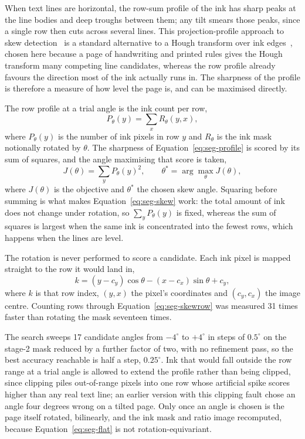 When text lines are horizontal, the row-sum profile of the ink has sharp peaks at the line bodies and deep troughs between them; any tilt smears those peaks, since a single row then cuts across several lines. This projection-profile approach to skew detection~\cite{postl1986} is a standard alternative to a Hough transform over ink edges~\cite{duda1972}, chosen here because a page of handwriting and printed rules gives the Hough transform many competing line candidates, whereas the row profile already favours the direction most of the ink actually runs in. The sharpness of the profile is therefore a measure of how level the page is, and can be maximised directly.

The row profile at a trial angle is the ink count per row,
\begin{equation}
P_\theta(y)=\sum_x R_\theta(y,x),
\label{eq:seg-profile}
\end{equation}
where $P_\theta(y)$ is the number of ink pixels in row $y$ and $R_\theta$ is the ink mask notionally rotated by $\theta$. The sharpness of Equation~\ref{eq:seg-profile} is scored by its sum of squares, and the angle maximising that score is taken,
\begin{equation}
J(\theta)=\sum_y P_\theta(y)^2,\qquad \theta^*=\arg\max_\theta J(\theta),
\label{eq:seg-skew}
\end{equation}
where $J(\theta)$ is the objective and $\theta^*$ the chosen skew angle. Squaring before summing is what makes Equation~\ref{eq:seg-skew} work: the total amount of ink does not change under rotation, so $\sum_yP_\theta(y)$ is fixed, whereas the sum of squares is largest when the same ink is concentrated into the fewest rows, which happens when the lines are level.

The rotation is never performed to score a candidate. Each ink pixel is mapped straight to the row it would land in,
\begin{equation}
k=(y-c_y)\cos\theta-(x-c_x)\sin\theta+c_y,
\label{eq:seg-skewrow}
\end{equation}
where $k$ is that row index, $(y,x)$ the pixel's coordinates and $(c_y,c_x)$ the image centre. Counting rows through Equation~\ref{eq:seg-skewrow} was measured 31 times faster than rotating the mask seventeen times.

The search sweeps 17 candidate angles from $-4^\circ$ to $+4^\circ$ in steps of $0.5^\circ$ on the stage-2 mask reduced by a further factor of two, with no refinement pass, so the best accuracy reachable is half a step, $0.25^\circ$. Ink that would fall outside the row range at a trial angle is allowed to extend the profile rather than being clipped, since clipping piles out-of-range pixels into one row whose artificial spike scores higher than any real text line; an earlier version with this clipping fault chose an angle four degrees wrong on a tilted page. Only once an angle is chosen is the page itself rotated, bilinearly, and the ink mask and ratio image recomputed, because Equation~\ref{eq:seg-flat} is not rotation-equivariant.

